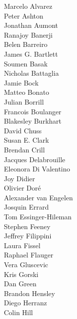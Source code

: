\documentclass[PICOReport.tex]{subfiles}
\begin{document}
\footnotesize {

\begin{multicols}{4}
Marcelo Alvarez                 \\
Peter Ashton                    \\
Jonathan Aumont                 \\
Ranajoy Banerji                 \\
Belen Barreiro                  \\
James G. Bartlett               \\
Soumen Basak                    \\
Nicholas Battaglia              \\
Jamie Bock                      \\
Matteo Bonato                   \\
Julian Borrill                  \\
Francois Boulanger              \\
Blakesley Burkhart              \\
David Chuss                     \\
Susan E. Clark                  \\
Brendan Crill                   \\
Jacques Delabrouille            \\
Eleonora Di Valentino           \\
Joy Didier                      \\
Olivier Dor\'e                  \\
Alexander van Engelen           \\
Josquin Errard                  \\
Tom Essinger-Hileman            \\
Stephen Feeney                  \\
Jeffrey Filippini               \\
Laura Fissel                    \\
Raphael Flauger                 \\
Vera Gluscevic                  \\
Kris Gorski                     \\
Dan Green                       \\
Brandon Hensley                 \\
Diego Herranz                   \\
Colin Hill                      \\

\end{multicols}}
\end{document}
